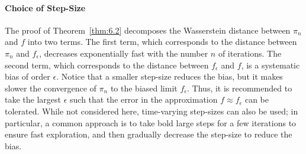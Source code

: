 \paragraph{Choice of Step-Size}
The proof of Theorem~\ref{thm:6.2} decomposes the Wasserstein distance between $\pi_n$ and
$f$ into two terms. The first term, which corresponds to the distance between $\pi_n$ and
$f_\epsilon$, decreases exponentially fast with the number $n$ of iterations. The second term,
which corresponds to the distance between $f_\epsilon$ and $f$, is a systematic bias of order
$\epsilon$. Notice that a smaller step-size reduces the bias, but it makes slower the convergence
of $\pi_n$ to the biased limit $f_\epsilon$. Thus, it is recommended to take the largest
$\epsilon$ such that the error in the approximation $f \approx f_\epsilon$ can be tolerated.
While not considered here, time-varying step-sizes can also be used; in particular, a common
approach is to take bold large steps for a few iterations to ensure fast exploration, and then
gradually decrease the step-size to reduce the bias.
